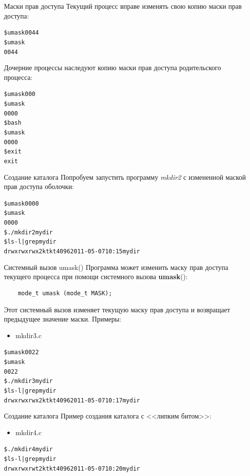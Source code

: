 \documentclass[xcolor=table]{beamer}
\begin{document}
\begin{frame}[fragile]{Маски прав доступа}
	Текущий процесс вправе изменять свою копию маски прав доступа:
	\begin{alltt}
		\$ umask 0044
		\$ umask
		0044
	\end{alltt}
	Дочерние процессы наследуют копию маски прав доступа родительского процесса:
	\begin{alltt}
		\$ umask 000
		\$ umask
		0000
		\$ bash
		\$ umask
		0000
		\$ exit
		exit
	\end{alltt}
\end{frame}

\begin{frame}[fragile]{Создание каталога}
	Попробуем запустить программу \textit{mkdir2} с измененной маской прав доступа оболочки:
	\begin{alltt}
		\$ umask 0000
		\$ umask
		0000
		\$ ./mkdir2 mydir
		\$ ls -l | grep mydir
		drwxrwxrwx 2 kt kt 4096 2011-05-07 10:15 mydir
	\end{alltt}
\end{frame}

\begin{frame}[fragile]{Системный вызов umask()}
	Программа может изменить маску прав доступа текущего процесса при помощи системного вызова \textbf{umask}():
	\begin{verbatim}
	mode_t umask (mode_t MASK);
	\end{verbatim}
	Этот системный вызов изменяет текущую маску прав доступа и возвращает предыдущее значение маски.
	Примеры: 
	\begin{itemize}
		\item mkdir3.c
	\end{itemize}
	\begin{alltt}
		\$ umask 0022
		\$ umask
		0022
		\$ ./mkdir3 mydir
		\$ ls -l | grep mydir
		drwxrwxrwx 2 kt kt 4096 2011-05-07 10:17 mydir
	\end{alltt}
\end{frame}

\begin{frame}[fragile]{Создание каталога}
	Пример создания каталога с <<липким битом>>:  
	\begin{itemize}
		\item mkdir4.c
	\end{itemize}
	\begin{alltt}
		\$ ./mkdir4 mydir
		\$ ls -l | grep mydir
		drwxrwxrwt 2 kt kt 4096 2011-05-07 10:20 mydir
	\end{alltt}
\end{frame}
\end{document}
